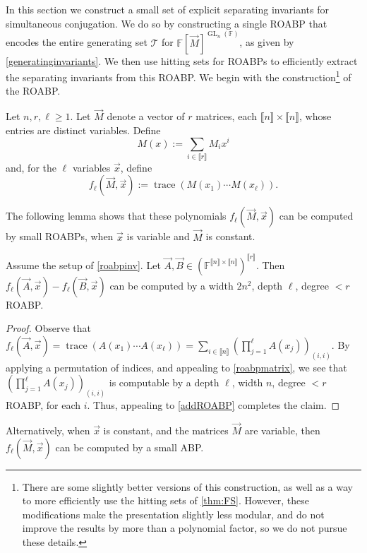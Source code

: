 \documentclass[letterpaper,11pt]{article}
\numberwithin{equation}{section}
\theoremstyle{plain}
\theoremstyle{remark}
\newcommand{\zr}[1]{{\llbracket {#1}\rrbracket}}
\DeclareMathOperator{\tr}{trace}
\DeclareMathOperator{\GL}{GL}
\newcommand{\F}{\mathbb{F}}
\newcommand{\cT}{\mathcal{T}}
\newcommand{\eqdef}{:=}
\begin{document}
In this section we construct a small set of explicit separating invariants for simultaneous conjugation.  We do so by constructing a single ROABP that encodes the entire generating set $\cT$ for $\F[\vec{M}]^{\GL_n(\F)}$, as given by \autoref{generatinginvariants}.  We then use hitting sets for ROABPs to efficiently extract the separating invariants from this ROABP.  We begin with the construction\footnote{There are some slightly better versions of this construction, as well as a way to more efficiently use the hitting sets of \autoref{thm:FS}.  However, these modifications make the presentation slightly less modular, and do not improve the results by more than a polynomial factor, so we do not pursue these details.} of the ROABP.

\begin{construction}
	\label{roabpinv}
	Let $n,r,\ell\ge 1$. Let $\vec{M}$ denote a vector of $r$ matrices, each $\zr{n}\times\zr{n}$, whose entries are distinct variables.  Define
	\[M(x)\eqdef \sum_{i\in\zr{r}} M_ix^i\]
	and, for the $\ell$ variables $\vec{x}$, define
	\[f_\ell(\vec{M},\vec{x})\eqdef \tr(M(x_1)\cdots M(x_\ell)).\]
\end{construction}

The following lemma shows that these polynomials $f_\ell(\vec{M},\vec{x})$ can be computed by small ROABPs, when $\vec{x}$ is variable and $\vec{M}$ is constant.

\begin{lemma}
	\label{diffofinv}
	Assume the setup of \autoref{roabpinv}. Let $\vec{A},\vec{B}\in(\F^{\zr{n}\times \zr{n}})^{\zr{r}}$. Then $f_\ell(\vec{A},\vec{x})-f_\ell(\vec{B},\vec{x})$ can be computed by a width $2n^2$, depth $\ell$, degree $<r$ ROABP.
\end{lemma}
\begin{proof}
	Observe that $f_\ell(\vec{A},\vec{x})=\tr(A(x_1)\cdots A(x_\ell))=\sum_{i\in\zr{n}} (\prod_{j=1}^\ell A(x_j))_{(i,i)}$.  By applying a permutation of indices, and appealing to \autoref{roabpmatrix}, we see that $(\prod_{j=1}^\ell A(x_j))_{(i,i)}$ is computable by a depth $\ell$, width $n$, degree $<r$ ROABP, for each $i$.  Thus, appealing to \autoref{addROABP} completes the claim.
\end{proof}

Alternatively, when $\vec{x}$ is constant, and the matrices $\vec{M}$ are variable, then $f_\ell(\vec{M},\vec{x})$ can be computed by a small ABP.
\end{document}
